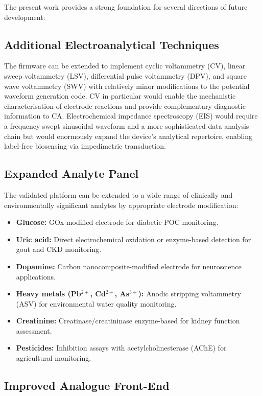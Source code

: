 The present work provides a strong foundation for several directions of future development:

\subsection{Additional Electroanalytical Techniques}

The firmware can be extended to implement cyclic voltammetry (CV), linear sweep voltammetry (LSV), differential pulse voltammetry (DPV), and square wave voltammetry (SWV) with relatively minor modifications to the potential waveform generation code. CV in particular would enable the mechanistic characterisation of electrode reactions and provide complementary diagnostic information to CA. Electrochemical impedance spectroscopy (EIS) would require a frequency-swept sinusoidal waveform and a more sophisticated data analysis chain but would enormously expand the device's analytical repertoire, enabling label-free biosensing via impedimetric transduction.

\subsection{Expanded Analyte Panel}

The validated platform can be extended to a wide range of clinically and environmentally significant analytes by appropriate electrode modification:
\begin{itemize}
    \item \textbf{Glucose:} GOx-modified electrode for diabetic POC monitoring.
    \item \textbf{Uric acid:} Direct electrochemical oxidation or enzyme-based detection for gout and CKD monitoring.
    \item \textbf{Dopamine:} Carbon nanocomposite-modified electrode for neuroscience applications.
    \item \textbf{Heavy metals (Pb$^{2+}$, Cd$^{2+}$, As$^{3+}$):} Anodic stripping voltammetry (ASV) for environmental water quality monitoring.
    \item \textbf{Creatinine:} Creatinase/creatininase enzyme-based for kidney function assessment.
    \item \textbf{Pesticides:} Inhibition assays with acetylcholinesterase (AChE) for agricultural monitoring.
\end{itemize}

\subsection{Improved Analogue Front-End}


